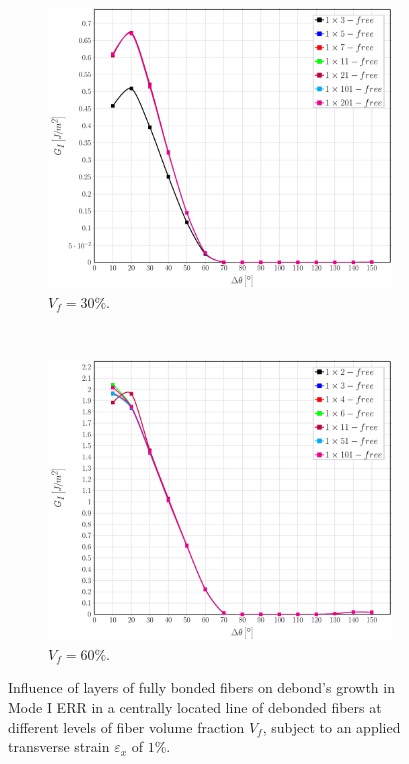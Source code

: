 \documentclass[review]{elsarticle}
\begin{document}
\begin{figure}[!h]
\centering
    \begin{subfigure}[b]{0.45\textwidth}
        \includegraphics[width=\textwidth]{abovefibers-vf30-GI.pdf}
        \caption{$V_{f}=30\%$.}\label{subfig:abovefiber30MI}
    \end{subfigure} ~
    \begin{subfigure}[b]{0.45\textwidth}
        \includegraphics[width=\textwidth]{abovefibers-vf60-GI.pdf}
        \caption{$V_{f}=60\%$.}\label{subfig:abovefiber60MI}
    \end{subfigure}

\caption{Influence of layers of fully bonded fibers on debond's growth in Mode I ERR in a centrally located line of debonded fibers at different levels of fiber volume fraction $V_{f}$, subject to an applied transverse strain $\varepsilon_{x}$ of $1\%$.}\label{fig:abovefibersMI}
\end{figure}
\end{document}
